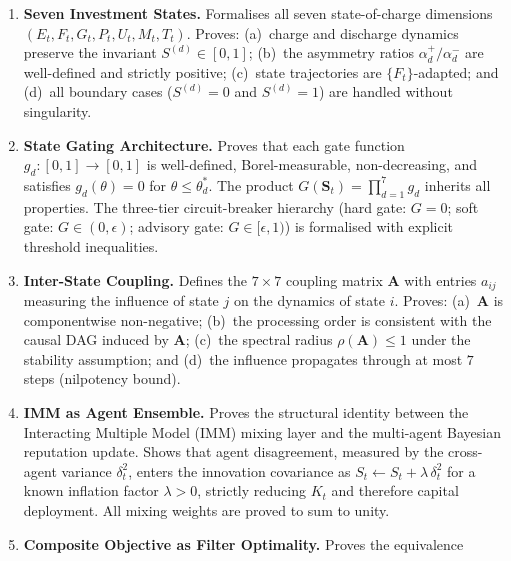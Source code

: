 \documentclass[12pt,openany]{book}
\newcommand{\bfA}{\mathbf{A}}
\newcommand{\calE}{\mathcal{E}}
\newcommand{\calF}{\mathcal{F}}
\newcommand{\calG}{\mathcal{G}}
\newcommand{\calP}{\mathcal{P}}
\newcommand{\calU}{\mathcal{U}}
\newcommand{\calM}{\mathcal{M}}
\newcommand{\calT}{\mathcal{T}}
\numberwithin{equation}{chapter}
\theoremstyle{plain}
\theoremstyle{definition}
\theoremstyle{remark}
\def\mathcal#1{#1}%
\begin{document}
\begin{enumerate}[label=\textbf{Ch.~\arabic*.}, leftmargin=3.8em,
                  itemsep=5pt, parsep=0pt, topsep=4pt]
        the matrix inversion lemma and positive-semidefinite
        ordering.
  \item \textbf{Seven Investment States.}
        Formalises all seven state-of-charge dimensions
        $(\calE_t,\calF_t,\calG_t,\calP_t,\calU_t,\calM_t,\calT_t)$.
        Proves: (a)~charge and discharge dynamics preserve the
        invariant $\mathcal{S}^{(d)}\in[0,1]$; (b)~the asymmetry
        ratios $\alpha_d^+/\alpha_d^-$ are well-defined and
        strictly positive; (c)~state trajectories are
        $\{\calF_t\}$-adapted; and (d)~all boundary cases
        ($\mathcal{S}^{(d)}=0$ and $\mathcal{S}^{(d)}=1$) are
        handled without singularity.
  \item \textbf{State Gating Architecture.}
        Proves that each gate function $g_d\colon[0,1]\to[0,1]$
        is well-defined, Borel-measurable, non-decreasing, and
        satisfies $g_d(\theta)=0$ for $\theta\leq\theta_d^*$.
        The product $G(\mathbf{S}_t)=\prod_{d=1}^{7}g_d$ inherits
        all properties.  The three-tier circuit-breaker hierarchy
        (hard gate: $G=0$; soft gate: $G\in(0,\epsilon)$; advisory
        gate: $G\in[\epsilon,1)$) is formalised with explicit
        threshold inequalities.
  \item \textbf{Inter-State Coupling.}
        Defines the $7\times 7$ coupling matrix $\bfA$ with
        entries $a_{ij}$ measuring the influence of state $j$ on
        the dynamics of state $i$.  Proves: (a)~$\bfA$ is
        componentwise non-negative; (b)~the processing order is
        consistent with the causal DAG induced by $\bfA$;
        (c)~the spectral radius $\rho(\bfA)\leq 1$ under the
        stability assumption; and (d)~the influence propagates
        through at most $7$ steps (nilpotency bound).
  \item \textbf{IMM as Agent Ensemble.}
        Proves the structural identity between the
        Interacting Multiple Model (IMM) mixing layer and the
        multi-agent Bayesian reputation update.  Shows that agent
        disagreement, measured by the cross-agent variance
        $\delta_t^2$, enters the innovation covariance as
        $S_t \leftarrow S_t + \lambda\,\delta_t^2$ for a
        known inflation factor $\lambda>0$, strictly reducing
        $K_t$ and therefore capital deployment.  All mixing
        weights are proved to sum to unity.
  \item \textbf{Composite Objective as Filter Optimality.}
        Proves the equivalence
        \begin{align*}

\end{align*}
\end{enumerate}
\end{document}

